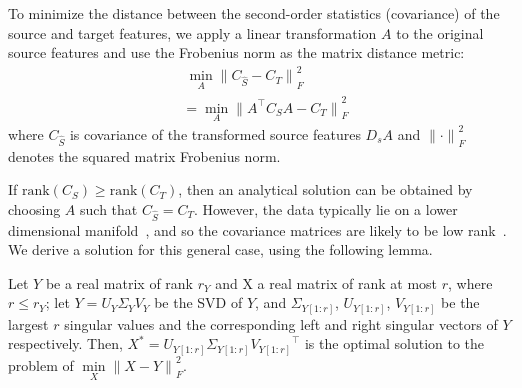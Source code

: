 \documentclass[graybox]{svmult}
\begin{document}
To minimize the distance between the second-order statistics (covariance) of the source and target features, we apply a linear transformation $A$ to the original source features and use the Frobenius norm as the matrix distance metric:
      \begin{equation}
      \begin{aligned}
      &~\underset{A}{\min} {\| C_{\hat{S}} - C_{T} \|}^2_F\\
      &= \underset{A}{\min} {\| A^{\top}C_{S}A - C_{T} \|}^2_F
      \end{aligned}
      \label{eq:obj}
      \end{equation}
where $C_{\hat{S}}$ is covariance of the transformed source features $D_sA$ and ${\|\cdot\|}^2_F$ denotes the squared matrix Frobenius norm. 

If $\mathrm{rank}(C_S) \geq \mathrm{rank}(C_T)$, then an analytical solution can be obtained by choosing $A$ such that $C_{\hat{S}}= C_{T}$.
However, the data typically lie on a lower dimensional manifold~\cite{outlooks,gfk,sa}, and so the covariance matrices are likely to be low rank~\cite{who}. We derive a solution for this general case, using the following lemma.
\begin{lemma} 
\label{lemma:svt}
Let $Y$ be a real matrix of rank $r_Y$ and X a real matrix of rank at most $r$, where ${r}\leqslant{r_Y}$; let $Y={U_Y}{\Sigma_Y}{V_Y}$ be the SVD of $Y$, and ${\Sigma_{Y[1:r]}}$, $U_{Y[1:r]}$, $V_{Y[1:r]}$ be the largest $r$ singular values and the corresponding left and right singular vectors of $Y$ respectively. Then, $X^{*} = U_{Y[1:r]}{\Sigma_{Y[1:r]}}{V_{Y[1:r]}}^{\top}$ is the optimal solution to the problem of $\underset{X}\min{\| X - Y \|}^2_F$.~\cite{SVT}
\end{lemma}
\end{document}
